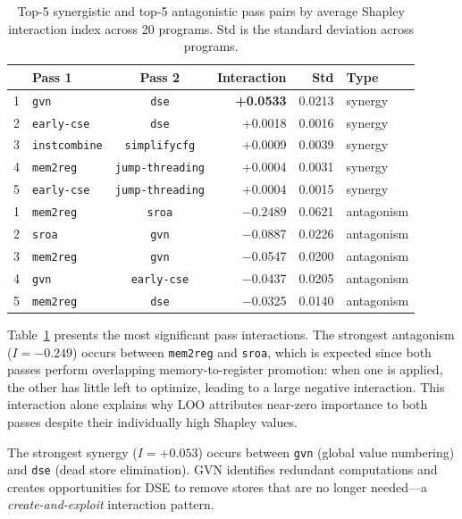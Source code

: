 \documentclass{article}
\newcommand{\sii}{I}
\begin{document}
\begin{table}[t]
\caption{Top-5 synergistic and top-5 antagonistic pass pairs by average Shapley interaction index across 20 programs. Std is the standard deviation across programs.}
\label{tab:interactions}
\centering
\begin{tabular}{llcrrl}
\toprule
& Pass 1 & Pass 2 & Interaction & Std & Type \\
\midrule
1 & \texttt{gvn} & \texttt{dse} & \textbf{+0.0533} & 0.0213 & synergy \\
2 & \texttt{early-cse} & \texttt{dse} & +0.0018 & 0.0016 & synergy \\
3 & \texttt{instcombine} & \texttt{simplifycfg} & +0.0009 & 0.0039 & synergy \\
4 & \texttt{mem2reg} & \texttt{jump-threading} & +0.0004 & 0.0031 & synergy \\
5 & \texttt{early-cse} & \texttt{jump-threading} & +0.0004 & 0.0015 & synergy \\
\midrule
1 & \texttt{mem2reg} & \texttt{sroa} & $\mathbf{-0.2489}$ & 0.0621 & antagonism \\
2 & \texttt{sroa} & \texttt{gvn} & $-$0.0887 & 0.0226 & antagonism \\
3 & \texttt{mem2reg} & \texttt{gvn} & $-$0.0547 & 0.0200 & antagonism \\
4 & \texttt{gvn} & \texttt{early-cse} & $-$0.0437 & 0.0205 & antagonism \\
5 & \texttt{mem2reg} & \texttt{dse} & $-$0.0325 & 0.0140 & antagonism \\
\bottomrule
\end{tabular}
\end{table}

Table~\ref{tab:interactions} presents the most significant pass interactions. The strongest antagonism ($\sii = -0.249$) occurs between \texttt{mem2reg} and \texttt{sroa}, which is expected since both passes perform overlapping memory-to-register promotion: when one is applied, the other has little left to optimize, leading to a large negative interaction. This interaction alone explains why LOO attributes near-zero importance to both passes despite their individually high Shapley values.

The strongest synergy ($\sii = +0.053$) occurs between \texttt{gvn} (global value numbering) and \texttt{dse} (dead store elimination). GVN identifies redundant computations and creates opportunities for DSE to remove stores that are no longer needed---a \emph{create-and-exploit} interaction pattern.
\end{document}

